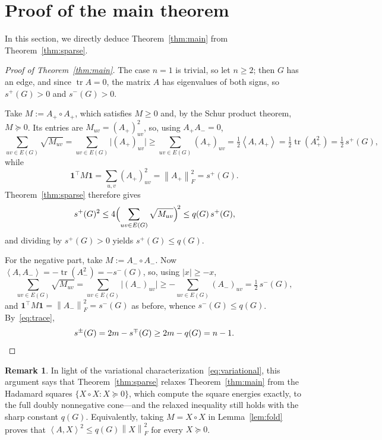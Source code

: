 \documentclass[11pt,letterpaper,reqno]{amsart}
\theoremstyle{definition}
\newtheorem{remark}[theorem]{Remark}
\newcommand{\tr}{\operatorname{tr}}
\newcommand{\ip}[2]{\left\langle #1,#2\right\rangle}
\newcommand{\norm}[1]{\left\lVert #1\right\rVert}
\newcommand{\ones}{\mathbf 1}
\begin{document}
\section{Proof of the main theorem}\label{sec:main}
In this section, we directly deduce Theorem~\ref{thm:main} from Theorem~\ref{thm:sparse}. 

\begin{proof}[Proof of Theorem~\ref{thm:main}]
The case $n=1$ is trivial, so let $n\ge2$; then $G$ has an edge, and
since $\tr A=0$, the matrix $A$ has eigenvalues of both signs, so
$s^+(G)>0$ and $s^-(G)>0$.

Take $M:=A_+\circ A_+$, which satisfies $M\ge0$ and, by the Schur
product theorem, $M\succeq0$.  Its entries are $M_{uv}=(A_+)_{uv}^2$,
so, using $A_+A_-=0$,
\[
    \sum_{uv\in E(G)}\sqrt{M_{uv}}
    =\sum_{uv\in E(G)}\bigl|(A_+)_{uv}\bigr|
    \ge\sum_{uv\in E(G)}(A_+)_{uv}
    =\tfrac12\ip A{A_+}
    =\tfrac12\tr(A_+^2)
    =\tfrac12\,s^+(G),
\]
while
\[
    \ones^{\top}M\ones=\sum_{u,v}(A_+)_{uv}^2=\norm{A_+}_F^2
    =s^+(G).
\]
Theorem~\ref{thm:sparse} therefore gives
\[
    s^+(G)^2
    \le4\Bigl(\sum_{uv\in E(G)}\sqrt{M_{uv}}\Bigr)^{\!2}
    \le q(G)\,s^+(G),
\]
and dividing by $s^+(G)>0$ yields $s^+(G)\le q(G)$.

For the negative part, take $M:=A_-\circ A_-$. Now
$\ip A{A_-}=-\tr(A_-^2)=-s^-(G)$, so, using $|x|\ge-x$,
\[
    \sum_{uv\in E(G)}\sqrt{M_{uv}}
    =\sum_{uv\in E(G)}\bigl|(A_-)_{uv}\bigr|
    \ge-\sum_{uv\in E(G)}(A_-)_{uv}
    =\tfrac12\,s^-(G),
\]
and $\ones^{\top}M\ones=\norm{A_-}_F^2=s^-(G)$ as before, whence
$s^-(G)\le q(G)$.  By~\eqref{eq:trace},
\[
    s^\pm(G)=2m-s^\mp(G)\ge2m-q(G)=n-1.
    \qedhere
\]
\end{proof}

\begin{remark}
In light of the variational
characterization~\eqref{eq:variational}, this argument says that
Theorem~\ref{thm:sparse} relaxes Theorem~\ref{thm:main} from the
Hadamard squares $\{X\circ X:X\succeq0\}$, which compute the square
energies exactly, to the full doubly nonnegative cone---and the
relaxed inequality still holds with the sharp constant $q(G)$.
Equivalently, taking $M=X\circ X$ in Lemma~\ref{lem:fold} proves that $\ip{A}{X}^{2}\le q(G)\norm X_F^2$ for every $X\succeq0$.
\end{remark}
\end{document}
